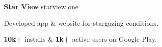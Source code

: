 \textbf{Star View} \hfill starview.one

	\begin{items}
		\item Developed app \& website for stargazing conditions.
		\item \textbf{10k+} installs \& \textbf{1k+} active users on Google Play.
	\end{items}